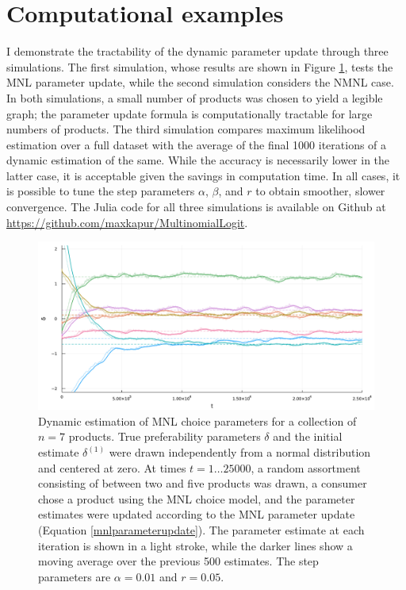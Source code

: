 \documentclass[preprint,12pt,authoryear]{elsarticle}
\begin{document}
\section{Computational examples}
I demonstrate the tractability of the dynamic parameter update through three simulations. The first simulation, whose results are shown in Figure \ref{param-est-dynamic-nonnested}, tests the MNL parameter update, while the second simulation considers the NMNL case. In both simulations, a small number of products was chosen to yield a legible graph; the parameter update formula is computationally tractable for large numbers of products. The third simulation compares maximum likelihood estimation over a full dataset with the average of the final 1000 iterations of a dynamic estimation of the same. While the accuracy is necessarily lower in the latter case, it is acceptable given the savings in computation time. In all cases, it is possible to tune the step parameters $\alpha$, $\beta$, and $r$ to obtain smoother, slower convergence. The Julia code for all three simulations is available on Github at \url{https://github.com/maxkapur/MultinomialLogit}. 

\begin{figure}
\begin{center}\includegraphics[width=\textwidth]{../plots/param-est-dynamic-nonnested.pdf}\end{center}
\captionsetup{singlelinecheck=off}
    \caption[.]{Dynamic estimation of MNL choice parameters for a collection of $n = 7$ products. True preferability parameters $\delta$ and the initial estimate $\delta^{(1)}$ were drawn independently from a normal distribution and centered at zero. At times $t = 1 \dots 25000$, a random assortment consisting of between two and five products was drawn, a consumer chose a product using the MNL choice model, and the parameter estimates were updated according to the MNL parameter update (Equation \ref{mnlparameterupdate}). The parameter estimate at each iteration is shown in a light stroke, while the darker lines show a moving average over the previous 500 estimates. The step parameters are $\alpha = 0.01$ and $r = 0.05$.}
\label{param-est-dynamic-nonnested}
\end{figure}
\end{document}
